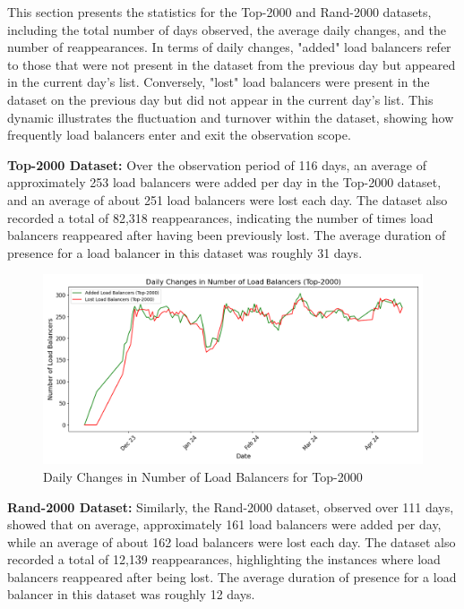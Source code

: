 \documentclass[12pt]{cwru_thesis}
\begin{document}
This section presents the statistics for the Top-2000 and Rand-2000 datasets, including the total number of days observed, the average daily changes, and the number of reappearances. In terms of daily changes, "added" load balancers refer to those that were not present in the dataset from the previous day but appeared in the current day's list. Conversely, "lost" load balancers were present in the dataset on the previous day but did not appear in the current day's list. This dynamic illustrates the fluctuation and turnover within the dataset, showing how frequently load balancers enter and exit the observation scope.


\textbf{Top-2000 Dataset:} Over the observation period of 116 days, an average of approximately 253 load balancers were added per day in the Top-2000 dataset, and an average of about 251 load balancers were lost each day. The dataset also recorded a total of 82,318 reappearances, indicating the number of times load balancers reappeared after having been previously lost. The average duration of presence for a load balancer in this dataset was roughly 31 days.

\begin{figure}[h!]
    \centering
    \includegraphics[width=\linewidth]{figures/load_balancer_changes_Top-2000.png}
    \caption{Daily Changes in Number of Load Balancers for Top-2000}
    \label{fig:top2000_changes}
\end{figure}

\textbf{Rand-2000 Dataset:} Similarly, the Rand-2000 dataset, observed over 111 days, showed that on average, approximately 161 load balancers were added per day, while an average of about 162 load balancers were lost each day. The dataset also recorded a total of 12,139 reappearances, highlighting the instances where load balancers reappeared after being lost. The average duration of presence for a load balancer in this dataset was roughly 12 days.
\end{document}
